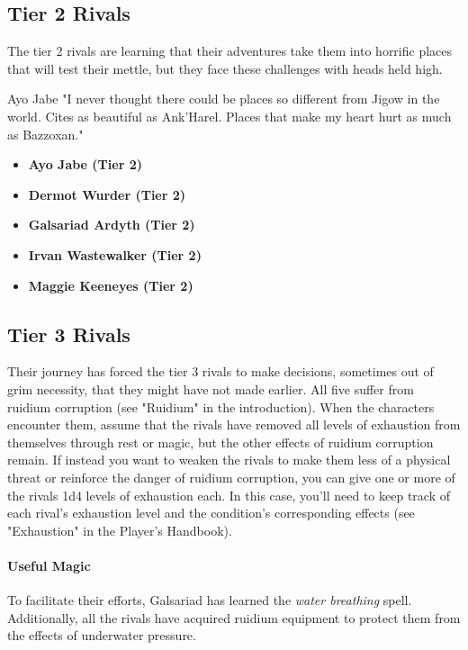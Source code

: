 \documentclass[10pt,a4,twoside,twocolumn,openany,nodeprecatedcode]{dndbook}
\begin{document}
\subsection{Tier 2 Rivals}
The tier 2 rivals are learning that their adventures take them into horrific places that will test their mettle, but they face these challenges with heads held high.
\begin{DndReadAloud}{Ayo Jabe}
"I never thought there could be places so different from Jigow in the world. Cites as beautiful as Ank'Harel. Places that make my heart hurt as much as Bazzoxan."
\end{DndReadAloud}

\begin{itemize}

\item \textbf{Ayo Jabe (Tier 2)}
\item \textbf{Dermot Wurder (Tier 2)}
\item \textbf{Galsariad Ardyth (Tier 2)}
\item \textbf{Irvan Wastewalker (Tier 2)}
\item \textbf{Maggie Keeneyes (Tier 2)}
\end{itemize}


\subsection{Tier 3 Rivals}
Their journey has forced the tier 3 rivals to make decisions, sometimes out of grim necessity, that they might have not made earlier. All five suffer from ruidium corruption (see "Ruidium" in the introduction). When the characters encounter them, assume that the rivals have removed all levels of exhaustion from themselves through rest or magic, but the other effects of ruidium corruption remain.
If instead you want to weaken the rivals to make them less of a physical threat or reinforce the danger of ruidium corruption, you can give one or more of the rivals 1d4 levels of exhaustion each. In this case, you'll need to keep track of each rival's exhaustion level and the condition's corresponding effects (see "Exhaustion" in the Player's Handbook).
\paragraph{Useful Magic}
To facilitate their efforts, Galsariad has learned the \textit{water breathing} spell. Additionally, all the rivals have acquired ruidium equipment to protect them from the effects of underwater pressure.
\end{document}
